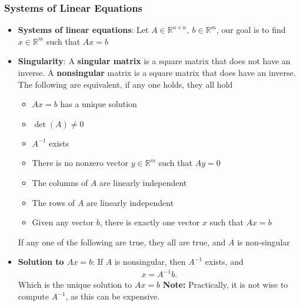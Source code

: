 \documentclass{report}
\begin{document}
    \pagebreak 
    \subsubsection{Systems of Linear Equations}
    \begin{itemize}
        \item \textbf{Systems of linear equations}: Let $A \in \mathbb{R}^{n\times n},\ b \in \mathbb{R}^{m}$, our goal is to find $x \in \mathbb{R}^{m}$ such that $Ax = b$
        \item \textbf{Singularity}: A \textbf{singular matrix} is a square matrix that does not have an inverse.
            \bigbreak \noindent 
            A \textbf{nonsingular} matrix is a square matrix that does have an inverse.
            \bigbreak \noindent 
            The following are equivalent, if any one holds, they all hold
            \begin{itemize}
                \item $Ax = b$ has a unique solution
                \item $\det(A)\ne 0$
                \item $A^{-1}$ exists
                \item There is no nonzero vector $y \in \mathbb{R}^{m}$ such that $Ay=0 $
                \item The columns of $A$ are linearly independent
                \item The rows of $A$ are linearly independent
                \item Given any vector $b$, there is exactly one vector $x$ such that $Ax=b$
            \end{itemize}
            If any one of the following are true, they all are true, and $A$ is non-singular
        \item \textbf{Solution to $Ax = b$}: If $A$ is nonsingular, then $A^{-1}$ exists, and
            \begin{align*}
                x = A^{-1}b
            .\end{align*}
            Which is the unique solution to $Ax=b$
            \bigbreak \noindent 
            \textbf{Note:} Practically, it is not wise to compute $A^{-1}$, as this can be expensive.
    \end{itemize}

    \pagebreak 
\end{document}
